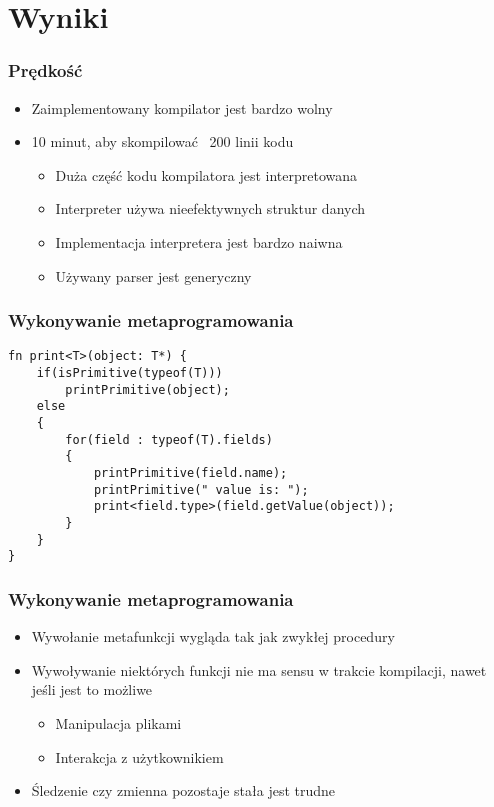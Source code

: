 \section{Wyniki}

\begin{frame}
	\frametitle{Prędkość}

	\begin{itemize}
		\item Zaimplementowany kompilator jest bardzo wolny
		\item 10 minut, aby skompilować ~200 linii kodu\begin{itemize}
			\item Duża część kodu kompilatora jest interpretowana
			\item Interpreter używa nieefektywnych struktur danych
			\item Implementacja interpretera jest bardzo naiwna
			\item Używany parser jest generyczny
		\end{itemize}
	\end{itemize}

\end{frame}

\begin{frame}[fragile]
	\frametitle{Wykonywanie metaprogramowania}

	\begin{lstlisting}
fn print<T>(object: T*) {
	if(isPrimitive(typeof(T)))
		printPrimitive(object);
	else
	{
		for(field : typeof(T).fields)
		{
			printPrimitive(field.name);
			printPrimitive(" value is: ");
			print<field.type>(field.getValue(object));
		}
	}
}
	\end{lstlisting}

\end{frame}

\begin{frame}
	\frametitle{Wykonywanie metaprogramowania}

\begin{itemize}
	\item Wywołanie metafunkcji wygląda tak jak zwykłej procedury
	\item Wywoływanie niektórych funkcji nie ma sensu w trakcie kompilacji, nawet jeśli jest to możliwe\begin{itemize}
		\item Manipulacja plikami
		\item Interakcja z użytkownikiem
	\end{itemize}
	\item Śledzenie czy zmienna pozostaje stała jest trudne
\end{itemize}

\end{frame}

